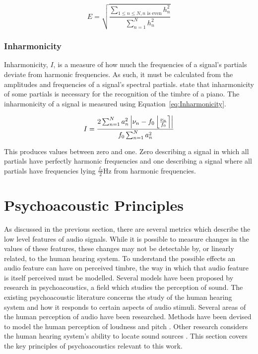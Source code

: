 			\begin{equation}
				E = \sqrt{\frac{\sum_{1 \leq n \leq N, n \text{ is even}} h_{n}^{2}}
					       {\sum_{n = 1}^{N} h_{n}^{2}}}
				\label{eq:Evenness}
			\end{equation}

		\subsubsection*{Inharmonicity}
			Inharmonicity, $I$, is a measure of how much the frequencies of a signal's partials deviate from
			harmonic frequencies. As such, it must be calculated from the amplitudes and frequencies of a
			signal's spectral partials. \citet{fletcher1962quality} state that inharmonicity of some partials
			is necessary for the recognition of the timbre of a piano. The inharmonicity of a signal is
			measured using Equation~\ref{eq:Inharmonicity}.
			
			\begin{equation}
				I = \frac{2\sum_{n = 1}^{N}a_{n}^{2}
					   \left|\nu_{n} - f_{0}\left\lfloor\frac{\nu_{n}}{f_{0}}\right\rceil\right|}
					   {f_{0}\sum_{n = 1}^{N} a_{n}^{2}}
				\label{eq:Inharmonicity}
			\end{equation}

			This produces values between zero and one. Zero describing a signal in which all partials have
			perfectly harmonic frequencies and one describing a signal where all partials have frequencies
			lying $\frac{f_{0}}{2}$Hz from harmonic frequencies.

\section{Psychoacoustic Principles}
\label{sec:Timbre-PsychoacousticPrinciples}
	As discussed in the previous section, there are several metrics which describe the low level features of audio
	signals. While it is possible to measure changes in the values of these features, these changes may not be
	detectable by, or linearly related, to the human hearing system. To understand the possible effects an audio
	feature can have on perceived timbre, the way in which that audio feature is itself perceived must be modelled.
	Several models have been proposed by research in psychoacoustics, a field which studies the perception of sound.
	The existing psychoacoustic literature concerns the study of the human hearing system and how it responds to
	certain aspects of audio stimuli. Several areas of the human perception of audio have been researched. Methods have
	been devised to model the human perception of loudness \citep{moore1997a} and pitch \citep{gerhard2003pitch}. Other
	research considers the human hearing system's ability to locate sound sources \citep{blauert1997spatial}. This
	section covers the key principles of psychoacoustics relevant to this work.

